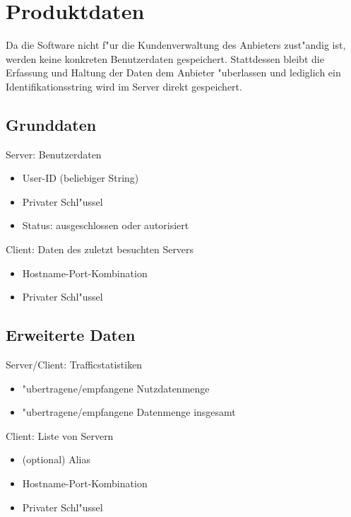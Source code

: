 \documentclass[a4paper,10pt]{scrartcl}
\begin{document}
\clearpage

\section{Produktdaten}
Da die Software nicht f"ur die Kundenverwaltung des Anbieters zust"andig ist, werden keine
konkreten Benutzerdaten gespeichert. Stattdessen bleibt die Erfassung und Haltung der Daten
dem Anbieter "uberlassen und lediglich ein Identifikationsstring wird im Server direkt gespeichert.

\subsection{Grunddaten}
\begin{usecase}
 {Server: Benutzerdaten
   \begin{itemize}
   \item User-ID (beliebiger String)
   \item Privater Schl"ussel
   \item Status: ausgeschlossen oder autorisiert
   \end{itemize}
}
 {Client: Daten des zuletzt besuchten Servers
   \begin{itemize}
   \item Hostname-Port-Kombination
   \item Privater Schl"ussel
   \end{itemize}
}
\end{usecase}

\subsection{Erweiterte Daten}
\begin{usecase}
 {Server/Client: Trafficstatistiken
   \begin{itemize}
   \item "ubertragene/empfangene Nutzdatenmenge
   \item "ubertragene/empfangene Datenmenge insgesamt
   \end{itemize}
}
 {Client: Liste von Servern
   \begin{itemize}
   \item (optional) Alias
   \item Hostname-Port-Kombination
   \item Privater Schl"ussel
   \end{itemize}
}
\end{usecase}
\clearpage
\end{document}
